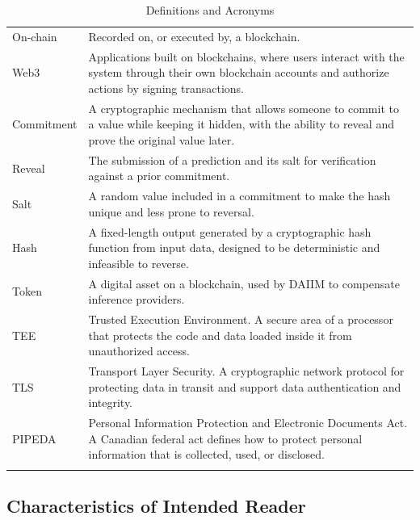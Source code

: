 \documentclass[12pt]{article}
\begin{document}
\begin{longtable}{p{} p{}}
On-chain & Recorded on, or executed by, a blockchain.\\
Web3 & Applications built on blockchains, where users interact with the system through their own blockchain accounts and authorize actions by signing transactions.\\
Commitment & A cryptographic mechanism that allows someone to commit to a value while keeping it hidden, with the ability to reveal and prove the original value later.\\
Reveal & The submission of a prediction and its salt for verification against a prior commitment.\\
Salt & A random value included in a commitment to make the hash unique and less prone to reversal.\\
Hash & A fixed-length output generated by a cryptographic hash function from input data, designed to be deterministic and infeasible to reverse.\\
Token & A digital asset on a blockchain, used by DAIIM to compensate inference providers.\\
TEE & Trusted Execution Environment. A secure area of a processor that protects the code and data loaded inside it from unauthorized access.\\
TLS & Transport Layer Security. A cryptographic network protocol for protecting data in transit and support data authentication and integrity.\\
PIPEDA & Personal Information Protection and Electronic Documents Act. A Canadian federal act defines how to protect personal information that is collected, used, or disclosed.\\
\bottomrule
\caption{Definitions and Acronyms} \label{tab:DefinitionsAndAcronyms}
\end{longtable}

\subsection{Characteristics of Intended Reader} \label{sec_IntendedReader}
\end{document}
